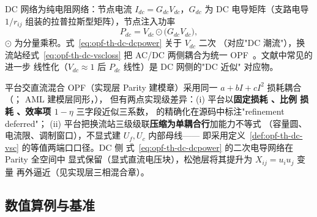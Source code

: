\begin{definition}[DC 电导网络]\label{def:opf-th-dc-dcgrid}
DC 网络为纯电阻网络：节点电流 $I_{dc}=G_{dc}V_{dc}$，$G_{dc}$ 为 DC
电导矩阵（支路电导 $1/r_{ij}$ 组装的拉普拉斯型矩阵），节点注入功率
\begin{equation}
P_{dc}=V_{dc}\odot\bigl(G_{dc}V_{dc}\bigr),
\label{eq:opf-th-dc-dcpower}
\end{equation}
$\odot$ 为分量乘积。式~\eqref{eq:opf-th-dc-dcpower} 关于 $V_{dc}$ 二次
（对应"DC 潮流"），换流站经式~\eqref{eq:opf-th-dc-vscloss} 把
AC/DC 两侧耦合为统一 OPF~\cite{opfdc:beerten}。文献中常见的进一步
线性化（$V_{dc}\approx1$ 后 $P_{dc}$ 线性）是 DC 网侧的"DC 近似"
对应物。
\end{definition}

\begin{remark}\label{rem:opf-th-dc-parity}
平台交直流混合 OPF（实现层 Parity 建模章）采用同一
$a+bI+cI^2$ 损耗耦合
（；
AML 建模层同形，），
但有两点实现级差异：(i) 平台以\textbf{固定损耗 、比例
损耗 、效率项 $1-\eta$} 三字段近似三系数，
 的精确化在源码中标注"refinement deferred"；
(ii) 平台把换流站三级级联\textbf{压缩为单耦合行}加能力不等式
（容量圆、电流限、调制窗口），不显式建 $U_f,U_c$ 内部母线——
即采用定义~\ref{def:opf-th-dc-vsc} 的等值两端口口径。DC 侧
式~\eqref{eq:opf-th-dc-dcpower} 的二次电导网络在 Parity 全空间中
显式保留（显式直流电压块），松弛层将其提升为 $X_{ij}=u_iu_j$ 变量
再外逼近（见实现层三相混合章）。
\end{remark}

\subsection{数值算例与基准}\label{sec:opf-th-dc-numexp}

